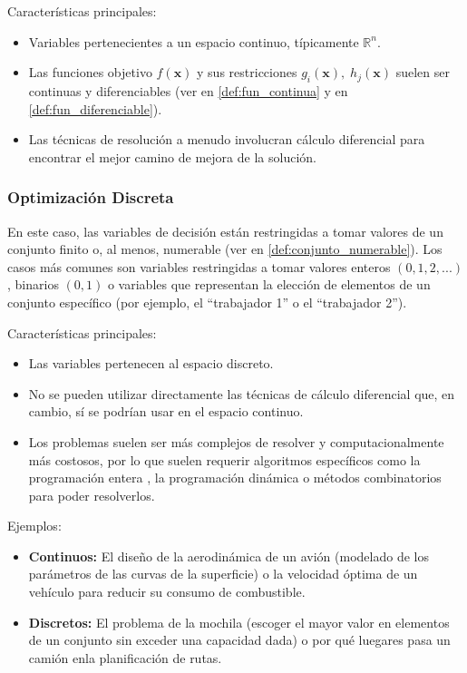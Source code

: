 \documentclass[12pt,a4paper]{book}
\begin{document}
Características principales:
\begin{itemize}
    \item Variables pertenecientes a un espacio continuo, típicamente $\mathbb{R}^n$.
    \item Las funciones objetivo $f(\mathbf{x})$ y sus restricciones $g_i(\mathbf{x}), \;h_j(\mathbf{x})$ suelen ser continuas y diferenciables (ver en \ref{def:fun_continua} y en \ref{def:fun_diferenciable}).
    \item Las técnicas de resolución a menudo involucran cálculo diferencial para encontrar el mejor camino de mejora de la solución.
\end{itemize}

\subsubsection{Optimización Discreta}
En este caso, las variables de decisión están restringidas a tomar valores de un conjunto finito o, al menos, numerable (ver en \ref{def:conjunto_numerable}). Los casos más comunes son variables restringidas a tomar valores enteros $(0,1,2,...)$, binarios $(0,1)$ o variables que representan la elección de elementos de un conjunto específico (por ejemplo, el ``trabajador 1'' o el ``trabajador 2'').

Características principales:
\begin{itemize}
    \item Las variables pertenecen al espacio discreto.
    \item No se pueden utilizar directamente las técnicas de cálculo diferencial que, en cambio, sí se podrían usar en el espacio continuo.
    \item Los problemas suelen ser más complejos de resolver y computacionalmente más costosos, por lo que suelen requerir algoritmos específicos como la programación entera \cite{int_programing}, la programación dinámica o métodos combinatorios para poder resolverlos.
\end{itemize}

Ejemplos:
\begin{itemize}
    \item \textbf{Continuos:} El diseño de la aerodinámica de un avión (modelado de los parámetros de las curvas de la superficie) o la velocidad óptima de un vehículo para reducir su consumo de combustible.
    \item \textbf{Discretos:} El problema de la mochila (escoger el mayor valor en elementos de un conjunto sin exceder una capacidad dada) o por qué luegares pasa un camión enla planificación de rutas.
\end{itemize}
\end{document}
